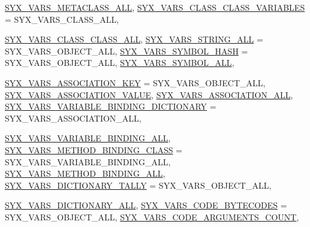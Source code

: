 \begin{CompactItemize}
\hyperlink{syx-enums_8h_c792ce905d7a570f1bf725aafa4d1d9b0094025d4574162e8568edce254f67be}{SYX\_\-VARS\_\-METACLASS\_\-ALL}, 
\hyperlink{syx-enums_8h_c792ce905d7a570f1bf725aafa4d1d9b9e9c24ec60adf22b4231c32edf8f7bc6}{SYX\_\-VARS\_\-CLASS\_\-CLASS\_\-VARIABLES} =  SYX\_\-VARS\_\-CLASS\_\-ALL, 
\par
\hyperlink{syx-enums_8h_c792ce905d7a570f1bf725aafa4d1d9bc8f3ec535187ff1d35e4a5cbd019c399}{SYX\_\-VARS\_\-CLASS\_\-CLASS\_\-ALL}, 
\hyperlink{syx-enums_8h_c792ce905d7a570f1bf725aafa4d1d9bd640004b8a4b4ce71073080a63632de6}{SYX\_\-VARS\_\-STRING\_\-ALL} =  SYX\_\-VARS\_\-OBJECT\_\-ALL, 
\hyperlink{syx-enums_8h_c792ce905d7a570f1bf725aafa4d1d9bf66e69e055683944127d06d2bd1b95f4}{SYX\_\-VARS\_\-SYMBOL\_\-HASH} =  SYX\_\-VARS\_\-OBJECT\_\-ALL, 
\hyperlink{syx-enums_8h_c792ce905d7a570f1bf725aafa4d1d9bae804736127adaee082edcf70c61cad1}{SYX\_\-VARS\_\-SYMBOL\_\-ALL}, 
\par
\hyperlink{syx-enums_8h_c792ce905d7a570f1bf725aafa4d1d9bb08245ac8fa1f43595c3484b87e07d0b}{SYX\_\-VARS\_\-ASSOCIATION\_\-KEY} =  SYX\_\-VARS\_\-OBJECT\_\-ALL, 
\hyperlink{syx-enums_8h_c792ce905d7a570f1bf725aafa4d1d9b031a228d78b963da170bb28289eec12e}{SYX\_\-VARS\_\-ASSOCIATION\_\-VALUE}, 
\hyperlink{syx-enums_8h_c792ce905d7a570f1bf725aafa4d1d9b573cea1728dae8b0b0e27f7bbcd117bc}{SYX\_\-VARS\_\-ASSOCIATION\_\-ALL}, 
\hyperlink{syx-enums_8h_c792ce905d7a570f1bf725aafa4d1d9b79ea460b7699ecfa641862fff5e934a9}{SYX\_\-VARS\_\-VARIABLE\_\-BINDING\_\-DICTIONARY} =  SYX\_\-VARS\_\-ASSOCIATION\_\-ALL, 
\par
\hyperlink{syx-enums_8h_c792ce905d7a570f1bf725aafa4d1d9b2ca7b907756820ba3355750ee4fdfd97}{SYX\_\-VARS\_\-VARIABLE\_\-BINDING\_\-ALL}, 
\hyperlink{syx-enums_8h_c792ce905d7a570f1bf725aafa4d1d9b7336b7438db0070dcbb87161ccf2599f}{SYX\_\-VARS\_\-METHOD\_\-BINDING\_\-CLASS} =  SYX\_\-VARS\_\-VARIABLE\_\-BINDING\_\-ALL, 
\hyperlink{syx-enums_8h_c792ce905d7a570f1bf725aafa4d1d9b2e7a4ee23bea0cad2186357aa041831c}{SYX\_\-VARS\_\-METHOD\_\-BINDING\_\-ALL}, 
\hyperlink{syx-enums_8h_c792ce905d7a570f1bf725aafa4d1d9be3eabe4137766c4c6e38a40e184fdc81}{SYX\_\-VARS\_\-DICTIONARY\_\-TALLY} =  SYX\_\-VARS\_\-OBJECT\_\-ALL, 
\par
\hyperlink{syx-enums_8h_c792ce905d7a570f1bf725aafa4d1d9b0f7ff8618479943745deea28a556a5c6}{SYX\_\-VARS\_\-DICTIONARY\_\-ALL}, 
\hyperlink{syx-enums_8h_c792ce905d7a570f1bf725aafa4d1d9bdd9dc4c90444540e919bfef3dbdaff58}{SYX\_\-VARS\_\-CODE\_\-BYTECODES} =  SYX\_\-VARS\_\-OBJECT\_\-ALL, 
\hyperlink{syx-enums_8h_c792ce905d7a570f1bf725aafa4d1d9be04ac80d44ef0f4d78e097cb8b064d29}{SYX\_\-VARS\_\-CODE\_\-ARGUMENTS\_\-COUNT}, 

\end{CompactItemize}
